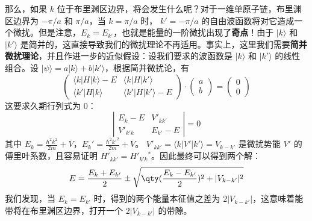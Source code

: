 那么，如果 $k$ 位于布里渊区边界，将会发生什么呢？对于一维单原子链，布里渊区边界为 $-\pi/a$ 和 $\pi/a$，当 $k=\pi/a$ 时， $k'=-\pi/a$ 的自由波函数将对它造成一个微扰。但是注意，$E_k=E_{k'}$，也就是能量的一阶微扰出现了\textbf{奇点}！由于 $|k\rangle$ 和 $|k'\rangle$ 是简并的，这直接导致我们的微扰理论不再适用。事实上，这里我们需要\textbf{简并微扰理论}，并且作进一步的近似假设：设我们要求的波函数是 $|k\rangle$ 和 $|k'\rangle$ 的线性组合。设 $|\psi\rangle=a|k\rangle+b|k'\rangle$，根据简并微扰论，有
\begin{equation}
\begin{pmatrix}
\langle k|H|k\rangle-E & \langle k|H|k'\rangle \\
\langle k'|H|k\rangle & \langle k'|H|k'\rangle - E   
\end{pmatrix}
\cdot
\begin{pmatrix}
a \\ b
\end{pmatrix}=
\begin{pmatrix}
0\\0
\end{pmatrix}
\end{equation}
这要求久期行列式为 $0$：
\begin{equation}
\left|
\begin{matrix}
E_k-E & V'_{k k'}\\
V'_{k'k}  & E_{k'}-E
\end{matrix}
\right|
=0
\end{equation}
其中 $E_k=\frac{\hbar^2 k^2}{2m}+\overline V$，$E_k'=\frac{\hbar^2 k'^2}{2m}+\overline V$。 $V'_{kk'}=\langle k|V'|k'\rangle=V_{k-k'}$ 是微扰势能 $V'$ 的傅里叶系数，且容易证明 $H'_{kk'}=H'_{k'k}{}^*$。因此最终可以得到两个解：
\begin{equation}
E=\frac{E_k+E_{k'}}{2}\pm \sqrt{\qty(\frac{E_k-E_{k'}}{2})^2+|V_{k-k'}|^2}
\end{equation}
我们发现，当 $E_k=E_{k'}$ 时，得到的两个能量本征值之差为 $2|V_{k-k'}|$，这意味着能带将在布里渊区边界，打开一个 $2|V_{k-k'}|$ 的带隙。